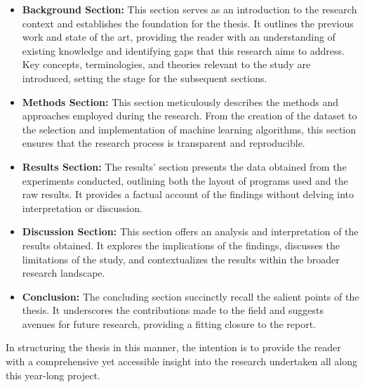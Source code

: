 	\begin{itemize}
		\item \textbf{Background Section:} This section serves as an introduction to the research context and establishes the foundation for the thesis. It outlines the previous work and state of the art, providing the reader with an understanding of existing knowledge and identifying gaps that this research aims to address. Key concepts, terminologies, and theories relevant to the study are introduced, setting the stage for the subsequent sections.
		
		
		\item \textbf{Methods Section:} This section meticulously describes the methods and approaches employed during the research. From the creation of the dataset to the selection and implementation of machine learning algorithms, this section ensures that the research process is transparent and reproducible.
		
		\item \textbf{Results Section:} The results' section presents the data obtained from the experiments conducted, outlining both the layout of programs used and the raw results. It provides a factual account of the findings without delving into interpretation or discussion.
		
		\item \textbf{Discussion Section:} This section offers an analysis and interpretation of the results obtained. It explores the implications of the findings, discusses the limitations of the study, and contextualizes the results within the broader research landscape.
		
		\item \textbf{Conclusion:} The concluding section succinctly recall the salient points of the thesis. It underscores the contributions made to the field and suggests avenues for future research, providing a fitting closure to the report.
	\end{itemize}
	
	In structuring the thesis in this manner, the intention is to provide the reader with a comprehensive yet accessible insight into the research undertaken all along this year-long project. 
	


